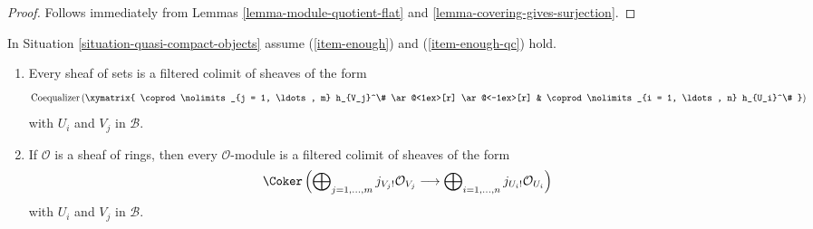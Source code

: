 \begin{proof}
Follows immediately from Lemmas \ref{lemma-module-quotient-flat} and
\ref{lemma-covering-gives-surjection}.
\end{proof}

\begin{lemma}
\label{lemma-module-filtered-colimit-constructibles}
In Situation \ref{situation-quasi-compact-objects} assume
(\ref{item-enough}) and (\ref{item-enough-qc}) hold.
\begin{enumerate}
\item Every sheaf of sets is a filtered colimit of sheaves of the form
\begin{equation}
\label{equation-towards-constructible-sets}
\text{Coequalizer}\left(
\xymatrix{
\coprod\nolimits_{j = 1, \ldots, m} h_{V_j}^\#
\ar@<1ex>[r] \ar@<-1ex>[r] &
\coprod\nolimits_{i = 1, \ldots, n} h_{U_i}^\#
}
\right)
\end{equation}
with $U_i$ and $V_j$ in $\mathcal{B}$.
\item If $\mathcal{O}$ is a sheaf of rings, then every $\mathcal{O}$-module
is a filtered colimit of sheaves of the form
\begin{equation}
\label{equation-towards-constructible}
\Coker\left(
\bigoplus\nolimits_{j = 1, \ldots, m} j_{V_j!}\mathcal{O}_{V_j}
\longrightarrow
\bigoplus\nolimits_{i = 1, \ldots, n} j_{U_i!}\mathcal{O}_{U_i}
\right)
\end{equation}
with $U_i$ and $V_j$ in $\mathcal{B}$.
\end{enumerate}
\end{lemma}

